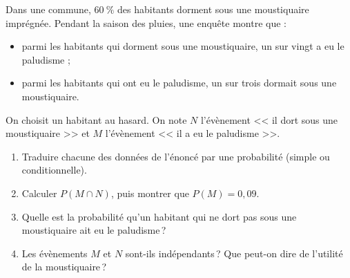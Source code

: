 %
\begin{exo}\label{exo:proba-16}
Dans une commune, $60~\%$ des habitants dorment sous une moustiquaire impr\'egn\'ee.
Pendant la saison des pluies, une enqu\^ete montre que :
\begin{itemize}
\item parmi les habitants qui dorment sous une moustiquaire, un sur vingt a eu le paludisme ;
\item parmi les habitants qui ont eu le paludisme, un sur trois dormait sous une moustiquaire.
\end{itemize}
On choisit un habitant au hasard. On note $N$ l'\'ev\`enement << il dort sous une moustiquaire >>
et $M$ l'\'ev\`enement << il a eu le paludisme >>.
\begin{enumerate}
\item Traduire chacune des donn\'ees de l'\'enonc\'e par une probabilit\'e (simple ou conditionnelle).
\item Calculer $P(M\cap N)$, puis montrer que $P(M) = 0,09$.
\item Quelle est la probabilit\'e qu'un habitant qui ne dort pas sous une moustiquaire ait eu le paludisme\,?
\item Les \'ev\`enements $M$ et $N$ sont-ils ind\'ependants\,?
      Que peut-on dire de l'utilit\'e de la moustiquaire\,?
\end{enumerate}
\end{exo}
%
